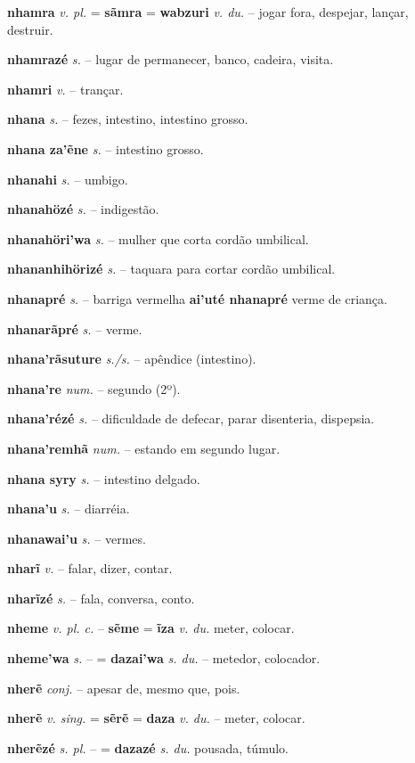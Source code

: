 \textbf{nhamra} \textit{v. pl.} = \textbf{sãmra} = \textbf{wabzuri} \textit{v. du.} -- jogar fora, despejar, lançar, destruir.

\textbf{nhamrazé} \textit{s.} -- lugar de permanecer, banco, cadeira, visita.

\textbf{nhamri} \textit{v.} -- trançar.

\textbf{nhana} \textit{s.} -- fezes, intestino, intestino grosso.

\textbf{nhana za'ẽne} \textit{s.} -- intestino grosso.

\textbf{nhanahi} \textit{s.} -- umbigo.

\textbf{nhanahözé} \textit{s.} -- indigestão.

\textbf{nhanahöri'wa} \textit{s.} -- mulher que corta cordão umbilical.

\textbf{nhananhihörizé} \textit{s.} -- taquara para cortar cordão umbilical.

\textbf{nhanapré} \textit{s.} -- barriga vermelha  \textbf{ai'uté nhanapré} verme de criança.

\textbf{nhanarãpré} \textit{s.} -- verme.

\textbf{nhana'rãsuture} \textit{s./s.} -- apêndice (intestino).

\textbf{nhana're} \textit{num.} -- segundo (2º).

\textbf{nhana'rézé} \textit{s.} -- dificuldade de defecar, parar disenteria, dispepsia.

\textbf{nhana'remhã} \textit{num.} -- estando em segundo lugar.

\textbf{nhana syry} \textit{s.} -- intestino delgado.

\textbf{nhana'u} \textit{s.} -- diarréia.

\textbf{nhanawai'u} \textit{s.} -- vermes.

\textbf{nharĩ} \textit{v.} -- falar, dizer, contar.

\textbf{nharĩzé} \textit{s.} -- fala, conversa, conto.

\textbf{nheme} \textit{v. pl. c.} -- \textbf{sẽme} = \textbf{ĩza} \textit{v. du.} meter, colocar.

\textbf{nheme'wa} \textit{s.} -- = \textbf{dazai'wa} \textit{s. du.} -- metedor, colocador.

\textbf{nherẽ} \textit{conj.} -- apesar de, mesmo que, pois.

\textbf{nherẽ} \textit{v. sing.} = \textbf{sẽrẽ} = \textbf{daza} \textit{v. du.} -- meter, colocar.

\textbf{nherẽzé} \textit{s. pl.} -- = \textbf{dazazé} \textit{s. du.} pousada, túmulo.

